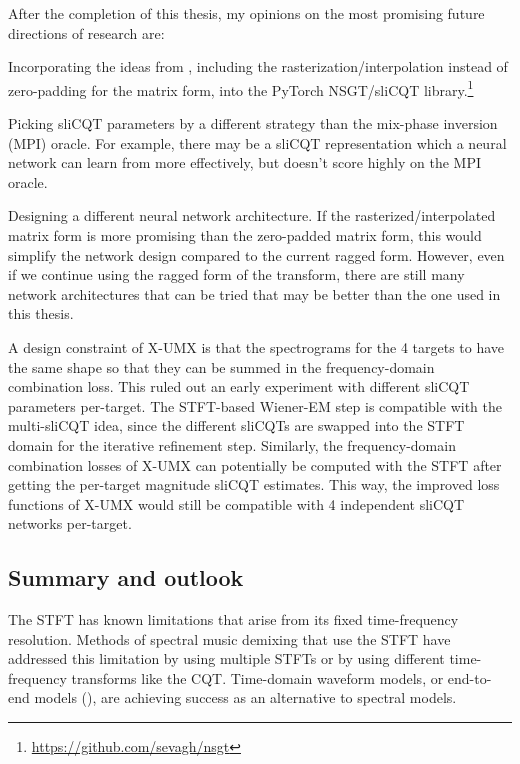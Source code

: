 \documentclass[report.tex]{subfiles}
\begin{document}
After the completion of this thesis, my opinions on the most promising future directions of research are:
\begin{tight_enumerate}
	\item
		Incorporating the ideas from \textcite{variableq1}, including the rasterization/interpolation instead of zero-padding for the matrix form, into the PyTorch NSGT/sliCQT library.\footnote{\url{https://github.com/sevagh/nsgt}}
	\item
		Picking sliCQT parameters by a different strategy than the mix-phase inversion (MPI) oracle. For example, there may be a sliCQT representation which a neural network can learn from more effectively, but doesn't score highly on the MPI oracle.
	\item
		Designing a different neural network architecture. If the rasterized/interpolated matrix form is more promising than the zero-padded matrix form, this would simplify the network design compared to the current ragged form. However, even if we continue using the ragged form of the transform, there are still many network architectures that can be tried that may be better than the one used in this thesis.
\end{tight_enumerate}

A design constraint of X-UMX is that the spectrograms for the 4 targets to have the same shape so that they can be summed in the frequency-domain combination loss. This ruled out an early experiment with different sliCQT parameters per-target. The STFT-based Wiener-EM step is compatible with the multi-sliCQT idea, since the different sliCQTs are swapped into the STFT domain for the iterative refinement step. Similarly, the frequency-domain combination losses of X-UMX can potentially be computed with the STFT after getting the per-target magnitude sliCQT estimates. This way, the improved loss functions of X-UMX would still be compatible with 4 independent sliCQT networks per-target.

\subsection{Summary and outlook}

The STFT has known limitations that arise from its fixed time-frequency resolution. Methods of spectral music demixing that use the STFT have addressed this limitation by using multiple STFTs or by using different time-frequency transforms like the CQT. Time-domain waveform models, or end-to-end models (\cite{waveunet, demucs, endtoend}), are achieving success as an alternative to spectral models.
\end{document}
